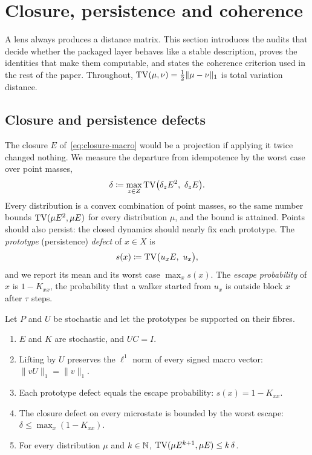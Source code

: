 \section{Closure, persistence and coherence}
\label{sec:closure}

A lens always produces a distance matrix.
This section introduces the audits that decide whether the packaged layer behaves like a stable description, proves the identities that make them computable, and states the coherence criterion used in the rest of the paper.
Throughout, $\mathrm{TV}(\mu,\nu)=\tfrac12\|\mu-\nu\|_1$ is total variation distance.

\subsection{Closure and persistence defects}

The closure $E$ of~\eqref{eq:closure-macro} would be a projection if applying it twice changed nothing.
We measure the departure from idempotence by the worst case over point masses,
\begin{equation}
\delta\coloneqq \max_{z\in Z}\mathrm{TV}\bigl(\delta_zE^2,\ \delta_zE\bigr).
\label{eq:delta}
\end{equation}
Every distribution is a convex combination of point masses, so the same number bounds $\mathrm{TV}(\mu E^2,\mu E)$ for every distribution $\mu$, and the bound is attained.
Points should also persist: the closed dynamics should nearly fix each prototype.
The \emph{prototype} (persistence) \emph{defect} of $x\in X$ is
\begin{equation}
s(x)\coloneqq \mathrm{TV}\bigl(u_xE,\ u_x\bigr),
\label{eq:stability}
\end{equation}
and we report its mean and its worst case $\max_x s(x)$.
The \emph{escape probability} of $x$ is $1-K_{xx}$, the probability that a walker started from $u_x$ is outside block $x$ after $\tau$ steps.

\begin{proposition}
\label{prop:closure-basic}
Let $P$ and $U$ be stochastic and let the prototypes be supported on their fibres.
\begin{enumerate}[label=(\roman*)]
\item $E$ and $K$ are stochastic, and $UC=I$.
\item Lifting by $U$ preserves the $\ell^1$ norm of every signed macro vector: $\|vU\|_1=\|v\|_1$.
\item Each prototype defect equals the escape probability: $s(x)=1-K_{xx}$.
\item The closure defect on every microstate is bounded by the worst escape:
$\delta\le\max_{x}(1-K_{xx})$.
\item For every distribution $\mu$ and $k\in\mathbb{N}$, $\mathrm{TV}(\mu E^{k+1},\mu E)\le k\,\delta$.
\end{enumerate}
\end{proposition}

